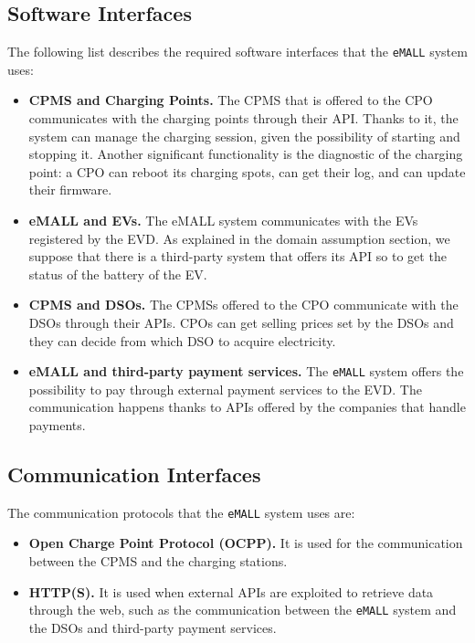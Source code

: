 \subsection{Software Interfaces}
\label{subsec:software_interfaces}%
The following list describes the required software interfaces that the \verb|eMALL| system uses:
\begin{itemize}
    \item \textbf{CPMS and Charging Points.} The CPMS that is offered to the CPO communicates with the charging points
    through their API\@.
    Thanks to it, the system can manage the charging session, given the possibility of starting and stopping it.
    Another significant functionality is the diagnostic of the charging point:
    a CPO can reboot its charging spots, can get their log, and can update their firmware.
    \item \textbf{eMALL and EVs.} The eMALL system communicates with the EVs registered by the EVD\@.
    As explained in the domain assumption section, we suppose that there is a third-party system that offers its API
    so to get the status of the battery of the EV\@.
    \item \textbf{CPMS and DSOs.} The CPMSs offered to the CPO communicate with the DSOs through their APIs.
    CPOs can get selling prices set by the DSOs and they can decide from which DSO to acquire electricity.
    \item \textbf{eMALL and third-party payment services.} The \verb|eMALL| system offers the possibility to pay through
    external payment services to the EVD. The communication happens thanks to APIs offered by the companies that handle payments.
\end{itemize}

\subsection{Communication Interfaces}
\label{subsec:communication_interfaces}%
The communication protocols that the \verb|eMALL| system uses are:
\begin{itemize}
    \item \textbf{Open Charge Point Protocol (OCPP).} It is used for the communication between the CPMS and the charging
    stations.
    \item \textbf{HTTP(S).} It is used when external APIs are exploited to retrieve data through the web, such as
    the communication between the \verb|eMALL| system and the DSOs and third-party payment services.
\end{itemize}


